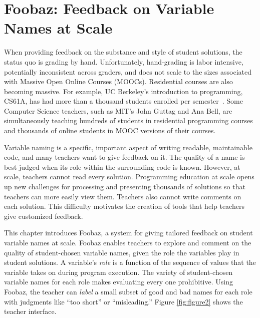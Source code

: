 \chapter{Foobaz: Feedback on Variable Names at Scale}\label{chapter:foobaz}

When providing feedback on the substance and style of student solutions, the status quo is grading by hand. Unfortunately, hand-grading is labor intensive, potentially inconsistent across graders, and does not scale to the sizes associated with Massive Open Online Courses (MOOCs). Residential courses are also becoming massive. For example, UC Berkeley's introduction to programming, CS61A, has had more than a thousand students enrolled per semester~\cite{biggestClass}. Some Computer Science teachers, such as MIT's John Guttag and Ana Bell, are simultaneously teaching hundreds of students in residential programming courses and thousands of online students in MOOC versions of their courses.

Variable naming is a specific, important aspect of writing readable, maintainable code, and many teachers want to give feedback on it. The quality of a name is best judged when its role within the surrounding code is known. However, at scale, teachers cannot read every solution. Programming education at scale opens up new challenges for processing and presenting thousands of solutions so that teachers can more easily view them. Teachers also cannot write comments on each solution. This difficulty motivates the creation of tools that help teachers give customized feedback.

This chapter introduces Foobaz, a system for giving tailored feedback on student variable names at scale. Foobaz enables teachers to explore and comment on the quality of student-chosen variable names, given the role the variables play in student solutions. A variable's {\it role} is a function of the sequence of values that the variable takes on during program execution. The variety of student-chosen variable names for each role makes evaluating every one prohibitive. Using Foobaz, the teacher can {\it label} a small subset of good and bad names for each role with judgments like ``too short'' or ``misleading.'' Figure \ref{fig:figure2} shows the teacher interface.

